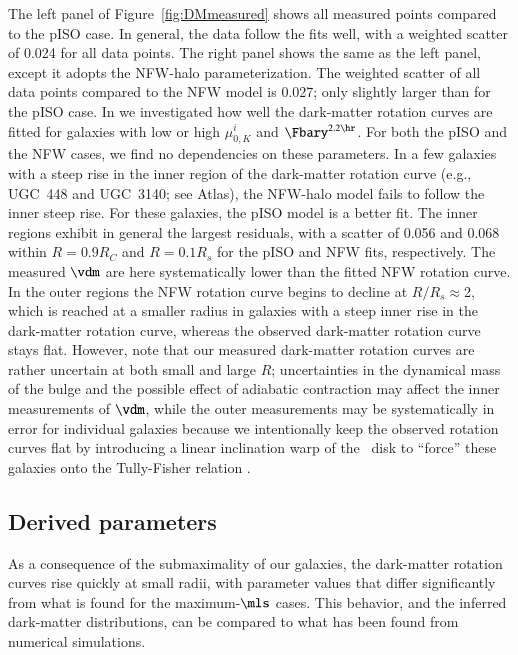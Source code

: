 \documentclass[traditabstract]{aa} %
\begin{document}
The left panel of Figure~\ref{fig:DMmeasured} shows all measured points compared to the
pISO case. In general, the data follow the fits well, with a weighted scatter of 0.024 for
all data points. The right panel shows the same as the left panel, except it adopts the
NFW-halo parameterization. The weighted scatter of all data points compared to the NFW
model is 0.027; only slightly larger than for the pISO case. In \cite{martinsson2011} we
investigated how well the dark-matter rotation curves are fitted for galaxies with low or
high $\mu_{0,K}^{i}$ and $\Fbary^{2.2\hr}$. For both the pISO and the NFW cases, we find
no dependencies on these parameters.
%
In a few galaxies with a steep rise in the inner region of the dark-matter rotation curve
(e.g., UGC~448 and UGC~3140; see Atlas), the NFW-halo model fails to follow the inner
steep rise. For these galaxies, the pISO model is a better fit. The inner regions exhibit
in general the largest residuals, with a scatter of 0.056 and 0.068 within $R$$=$$0.9R_C$
and $R$$=$$0.1R_s$ for the pISO and NFW fits, respectively. The measured $\vdm$ are here
systematically lower than the fitted NFW rotation curve.
%
In the outer regions the NFW rotation curve begins to decline at $R/R_s$$\approx$2, which
is reached at a smaller radius in galaxies with a steep inner rise in the dark-matter 
rotation curve, whereas the observed dark-matter rotation curve stays flat. However, note
that our measured dark-matter rotation curves are rather uncertain at both small and large
$R$; uncertainties in the dynamical mass of the bulge and the possible effect of adiabatic
contraction may affect the inner measurements of $\vdm$, while the outer measurements may
be systematically in error for individual galaxies because we intentionally keep the 
observed rotation curves flat by introducing a linear inclination warp of the \hone\ disk 
to ``force'' these galaxies onto the Tully-Fisher relation \citep{martinsson2011}.


\subsection{Derived parameters}
\label{sec:DMRCshape_comp}
As a consequence of the submaximality of our galaxies, the dark-matter rotation curves
rise quickly at small radii, with parameter values that differ significantly from what is
found for the maximum-$\mls$ cases. This behavior, and the inferred dark-matter
distributions, can be compared to what has been found from numerical simulations.
\end{document}
